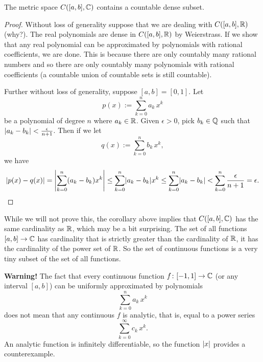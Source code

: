 \begin{cor}
The metric space $C([a,b],{\mathbb{C}})$ contains a countable dense subset.
\end{cor}

\begin{proof}
Without loss of generality suppose that we are dealing with $C([a,b],{\mathbb{R}})$
(why?).
The real polynomials are dense in $C([a,b],{\mathbb{R}})$ by Weierstrass.  If we show that
any real polynomial can be approximated by polynomials with rational
coefficients, we are done.  This is because there are only countably many
rational numbers and so there are only countably many polynomials with
rational coefficients (a countable union of countable sets is still
countable).

Further without loss of generality, suppose $[a,b]=[0,1]$.  Let
\begin{equation*}
p(x) := \sum_{k=0}^n a_k\,  x^k
\end{equation*}
be a polynomial of degree $n$ where $a_k \in {\mathbb{R}}$.  Given $\epsilon > 0$, pick $b_k \in {\mathbb{Q}}$
such that $\lvert {a_k-b_k} \rvert < \frac{\epsilon}{n+1}$.  Then
if we let
\begin{equation*}
q(x) := \sum_{k=0}^n b_k \, x^k ,
\end{equation*}
we have
\begin{equation*}
\lvert {p(x)-q(x)} \rvert
=
\left\lvert {\sum_{k=0}^n (a_k-b_k) x^k} \right\rvert
\leq
\sum_{k=0}^n \lvert {a_k-b_k} \rvert x^k
\leq
\sum_{k=0}^n \lvert {a_k-b_k} \rvert
<
\sum_{k=0}^n \frac{\epsilon}{n+1} = \epsilon . \qedhere
\end{equation*}
\end{proof}

\begin{remark}
While we will not prove this, the corollary above implies that
$C([a,b],{\mathbb{C}})$ has the same cardinality as ${\mathbb{R}}$, which may be a
bit surprising.  The set of all functions $[a,b] \to {\mathbb{C}}$ has
cardinality that is strictly greater than the cardinality of ${\mathbb{R}}$, it has the
cardinality of the power set of ${\mathbb{R}}$.  So the
set of continuous functions is a very tiny subset of the set of all
functions.
\end{remark}

\textbf{Warning!}
The fact that every continuous function $f \colon [-1,1] \to {\mathbb{C}}$ (or any
interval $[a,b]$) can be uniformly
approximated by polynomials
\begin{equation*}
\sum_{k=0}^n a_k\,  x^k
\end{equation*}
does not mean that any continuous $f$ is analytic, that is, equal to a
power series
\begin{equation*}
\sum_{k=0}^\infty c_k\,  x^k .
\end{equation*}
An analytic function is infinitely differentiable, so the function
$\lvert {x} \rvert$ provides a counterexample.

